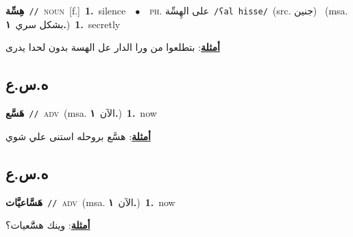 \documentclass[10pt,a4paper,twoside]{article} %
\begin{document}
\begin{multicols}{2}
{\setlength\topsep{0pt}\textbf{\foreignlanguage{arabic}{هِسِّة}}\ {\color{gray}\texttt{//}\color{black}}\ \textsc{noun}\ [f.]\ \textbf{1.}~silence\ \ $\bullet$\ \ \textsc{ph.} \color{gray} \foreignlanguage{arabic}{على الهِسِّة}\color{black}\ {\color{gray}\texttt{/{\sffamily ʕal hisse}/}\color{black}}\ \color{gray}(src. \foreignlanguage{arabic}{جنين})\color{black}\ \color{gray} (msa. \foreignlanguage{arabic}{بشكل سري}~\foreignlanguage{arabic}{\textbf{١.}})\color{black}\ \textbf{1.}~secretly\  \begin{flushright}\color{gray}\foreignlanguage{arabic}{\textbf{\underline{\foreignlanguage{arabic}{أمثلة}}}: بتطلعوا من ورا الدار عل الهسة بدون لحدا يدرى}\end{flushright}\color{black}} \vspace{2mm}

\vspace{-3mm}
\subsection*{\color{blue}\foreignlanguage{arabic}{ه.س.ع}\color{blue}{}} 

{\setlength\topsep{0pt}\textbf{\foreignlanguage{arabic}{هَسَّع}}\ {\color{gray}\texttt{//}\color{black}}\ \textsc{adv}\ \color{gray}(msa. \foreignlanguage{arabic}{الآن}~\foreignlanguage{arabic}{\textbf{١.}})\color{black}\ \textbf{1.}~now\  \begin{flushright}\color{gray}\foreignlanguage{arabic}{\textbf{\underline{\foreignlanguage{arabic}{أمثلة}}}: هسَّع بروحله استنى علي شوي}\end{flushright}\color{black}} \vspace{2mm}

\vspace{-3mm}
\subsection*{\color{blue}\foreignlanguage{arabic}{ه.س.ع}\color{blue}{ (ntws)}} 

{\setlength\topsep{0pt}\textbf{\foreignlanguage{arabic}{هَسَّاعيَّات}}\ {\color{gray}\texttt{//}\color{black}}\ \textsc{adv}\ \color{gray}(msa. \foreignlanguage{arabic}{الآن}~\foreignlanguage{arabic}{\textbf{١.}})\color{black}\ \textbf{1.}~now\  \begin{flushright}\color{gray}\foreignlanguage{arabic}{\textbf{\underline{\foreignlanguage{arabic}{أمثلة}}}: وينك هسَّّعيات؟}\end{flushright}\color{black}} \vspace{2mm}


\end{multicols}
\end{document}
